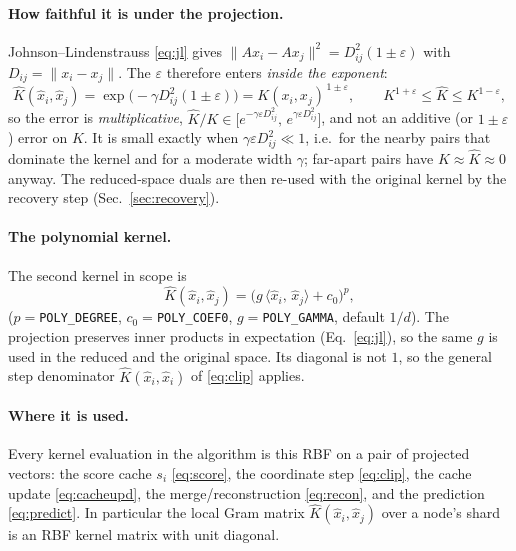 \documentclass[11pt]{article}
\newcommand{\ip}[2]{\langle #1,\, #2\rangle}
\begin{document}
\paragraph{How faithful it is under the projection.} Johnson--Lindenstrauss
\eqref{eq:jl} gives $\|Ax_i-Ax_j\|^2=D_{ij}^2(1\pm\varepsilon)$ with
$D_{ij}=\|x_i-x_j\|$. The $\varepsilon$ therefore enters \emph{inside the exponent}:
\begin{equation}\label{eq:kernelerr}
  \hat K(\hat x_i,\hat x_j)
  = \exp\!\big(-\gamma D_{ij}^2(1\pm\varepsilon)\big)
  = K(x_i,x_j)^{\,1\pm\varepsilon},
  \qquad
  K^{1+\varepsilon}\le\hat K\le K^{1-\varepsilon},
\end{equation}
so the error is \emph{multiplicative},
$\hat K/K\in\big[e^{-\gamma\varepsilon D_{ij}^2},\,e^{\gamma\varepsilon D_{ij}^2}\big]$,
and not an additive (or $1\pm\varepsilon$) error on $K$. It is small exactly when
$\gamma\varepsilon D_{ij}^2\ll1$, i.e.\ for the nearby pairs that dominate the
kernel and for a moderate width $\gamma$; far-apart pairs have $K\approx\hat K\approx0$
anyway. The reduced-space duals are then re-used with the original kernel by the
recovery step (Sec.~\ref{sec:recovery}).

\paragraph{The polynomial kernel.} The second kernel in scope is
\begin{equation}\label{eq:poly}
  \hat K(\hat x_i,\hat x_j)=\big(g\,\ip{\hat x_i}{\hat x_j}+c_0\big)^{p},
\end{equation}
($p=$\texttt{POLY\_DEGREE}, $c_0=$\texttt{POLY\_COEF0}, $g=$\texttt{POLY\_GAMMA},
default $1/d$). The projection preserves inner products in expectation
(Eq.~\eqref{eq:jl}), so the same $g$ is used in the reduced and the original space.
Its diagonal is not $1$, so the general step denominator $\hat K(\hat x_i,\hat x_i)$
of \eqref{eq:clip} applies.

\paragraph{Where it is used.} Every kernel evaluation in the algorithm is this RBF on
a pair of projected vectors: the score cache $s_i$ \eqref{eq:score}, the coordinate
step \eqref{eq:clip}, the cache update \eqref{eq:cacheupd}, the
merge/reconstruction \eqref{eq:recon}, and the prediction \eqref{eq:predict}. In
particular the local Gram matrix $\hat K(\hat x_i,\hat x_j)$ over a node's shard is an
RBF kernel matrix with unit diagonal.
\end{document}
